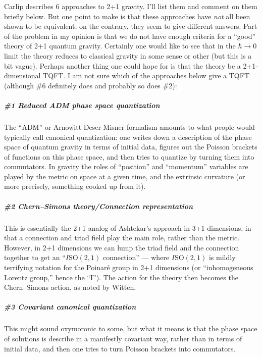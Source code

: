 \documentclass{article}
\begin{document}
Carlip describes 6 approaches to 2+1 gravity. I'll list them and comment
on them briefly below. But one point to make is that these approaches
have \emph{not} all been shown to be equivalent; on the contrary, they
seem to give different answers. Part of the problem in my opinion is
that we do not have enough criteria for a ``good'' theory of 2+1 quantum
gravity. Certainly one would like to see that in the \(\hbar\to 0\)
limit the theory reduces to classical gravity in some sense or other
(but this is a bit vague). Perhaps another thing one could hope for is
that the theory be a 2+1-dimensional TQFT. I am not sure which of the
approaches below give a TQFT (although \#6 definitely does and probably
so does \#2):

\hypertarget{reduced-adm-phase-space-quantization}{%
\subparagraph{\#1 Reduced ADM phase space
quantization}\label{reduced-adm-phase-space-quantization}}

The ``ADM'' or Arnowitt-Deser-Misner formalism amounts to what people
would typically call canonical quantization: one writes down a
description of the phase space of quantum gravity in terms of initial
data, figures out the Poisson brackets of functions on this phase space,
and then tries to quantize by turning them into commutators. In gravity
the roles of ``position'' and ``momentum'' variables are played by the
metric on space at a given time, and the extrinsic curvature (or more
precisely, something cooked up from it).

\hypertarget{chern-simons-theoryconnection-representation}{%
\subparagraph{\#2 Chern--Simons theory/Connection
representation}\label{chern-simons-theoryconnection-representation}}

This is essentially the 2+1 analog of Ashtekar's approach in 3+1
dimensions, in that a connection and triad field play the main role,
rather than the metric. However, in 2+1 dimensions we can lump the triad
field and the connection together to get an ``\(I\mathrm{SO}(2,1)\)
connection'' --- where \(I\mathrm{SO}(2,1)\) is mildly terrifying
notation for the Poinar\'e group in 2+1 dimensions (or ``inhomogeneous
Lorentz group,'' hence the ``I''). The action for the theory then
becomes the Chern--Simons action, as noted by Witten.

\hypertarget{covariant-canonical-quantization}{%
\subparagraph{\#3 Covariant canonical
quantization}\label{covariant-canonical-quantization}}

This might sound oxymoronic to some, but what it means is that the phase
space of solutions is describe in a manifestly covariant way, rather
than in terms of initial data, and then one tries to turn Poisson
brackets into commutators.
\end{document}
